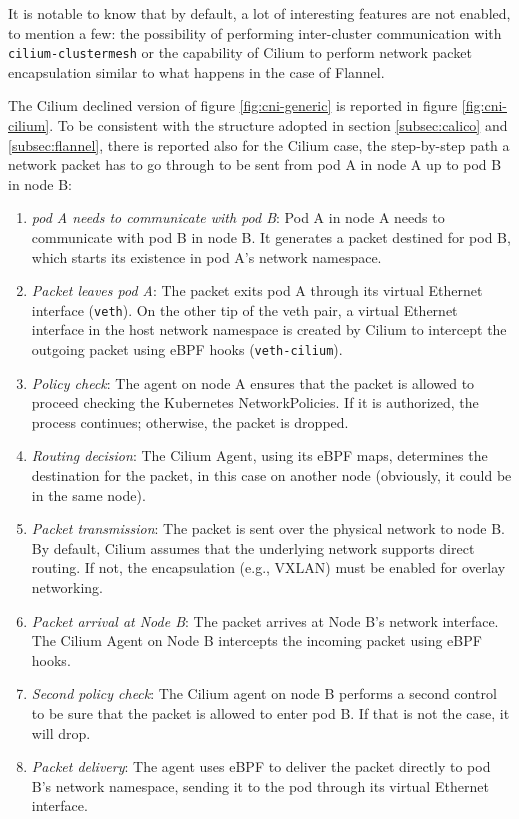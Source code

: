 It is notable to know that by default, a lot of interesting features are not
enabled, to mention a few: the possibility of performing inter-cluster
communication with \texttt{cilium-clustermesh} or the capability of Cilium to
perform network packet encapsulation similar to what happens in the case of
Flannel.

The Cilium declined version of figure \ref{fig:cni-generic} is reported in
figure \ref{fig:cni-cilium}. To be consistent with the structure adopted in
section \ref{subsec:calico} and \ref{subsec:flannel}, there is reported also
for the Cilium case, the step-by-step path a network packet has to go through to
be sent from pod A in node A up to pod B in node B:

\begin{enumerate}
  \itemsep0em
  \item \textit{pod A needs to communicate with pod B}: Pod A in node A needs to
    communicate with pod B in node B. It generates a packet destined for pod B,
    which starts its existence in pod A's network namespace.
  \item \textit{Packet leaves pod A}: The packet exits pod A through its virtual
    Ethernet interface (\texttt{veth}). On the other tip of the veth pair, a
    virtual Ethernet interface in the host network namespace is created by
    Cilium to intercept the outgoing packet using eBPF hooks
    (\texttt{veth-cilium}).
  \item \textit{Policy check}: The agent on node A ensures that the packet is
    allowed to proceed checking the Kubernetes NetworkPolicies. If it is
    authorized,  the process continues; otherwise, the packet is dropped.
  \item \textit{Routing decision}: The Cilium Agent, using its eBPF maps,
    determines the destination for the packet, in this case on another node
    (obviously, it could be in the same node).
  \item \textit{Packet transmission}: The packet is sent over the physical
    network to node B. By default, Cilium assumes that the underlying network
    supports direct routing. If not, the encapsulation (e.g., VXLAN) must be
    enabled for overlay networking.
  \item \textit{Packet arrival at Node B}: The packet arrives at Node B's
    network interface. The Cilium Agent on Node B intercepts the incoming packet
    using eBPF hooks.
  \item \textit{Second policy check}: The Cilium agent on node B performs a
    second control to be sure that the packet is allowed to enter pod B.
    If that is not the case, it will drop.
  \item \textit{Packet delivery}: The agent uses eBPF to deliver the packet
    directly to pod B's network namespace, sending it to the pod through its
    virtual Ethernet interface.
\end{enumerate}

